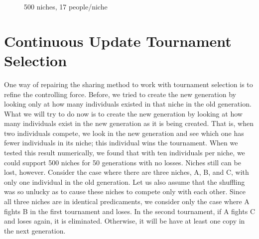 \begin{figure}
\caption{500 niches, 17 people/niche}
\end{figure}

\section{Continuous Update Tournament Selection}
One way of repairing the sharing method to work with tournament selection
is to refine the controlling force.  Before, we tried to create the
new generation by looking only at how many individuals existed in that
niche in the old generation.  What we will try to do now is to create
the new generation by looking at how many individuals exist in the new
generation as it is being created.  That is, when two individuals
compete, we look in the new generation and see which one has fewer
individuals in its niche; this individual wins the tournament.  When we
tested this result numerically, we found that with ten individuals per
niche, we could support 500 niches for 50 generations with no losses.
Niches still can be lost, however.  Consider the case where there are three
niches, A, B, and C, with only one individual in the old generation.
Let us also assume that the shuffling was so unlucky as to cause these niches
to compete only with each other.  Since all three niches are in identical
predicaments, we consider only the case where A fights B in the first
tournament and loses.  In the second tournament, if A fights C and loses
again, it is eliminated.  Otherwise, it will be have at least one copy
in the next generation.

